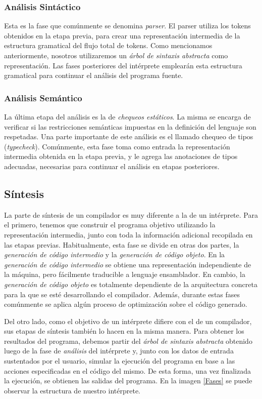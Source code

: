 \subsubsection{Análisis Sintáctico}

Esta es la fase que comúnmente se denomina \textit{parser}.
El parser utiliza los tokens obtenidos en la etapa previa, para crear una representación intermedia de la estructura gramatical del flujo total de tokens.
Como mencionamos anteriormente, nosotros utilizaremos un \textit{árbol de sintaxis abstracta} como representación.
Las fases posteriores del intérprete emplearán esta estructura gramatical para continuar el análisis del programa fuente.

\subsubsection{Análisis Semántico}

La última etapa del análisis es la de \textit{chequeos estáticos}.
La misma se encarga de verificar si las restricciones semánticas impuestas en la definición del lenguaje son respetadas.
Una parte importante de este análisis es el llamado chequeo de tipos (\textit{typecheck}).
Comúnmente, esta fase toma como entrada la representación intermedia obtenida en la etapa previa, y le agrega las anotaciones de tipos adecuadas, necesarias para continuar el análisis en etapas posteriores.

\subsection{Síntesis}

La parte de síntesis de un compilador es muy diferente a la de un intérprete.
Para el primero, tenemos que construir el programa objetivo utilizando la representación intermedia, junto con toda la información adicional recopilada en las etapas previas.
Habitualmente, esta fase se divide en otras dos partes, la \textit{generación de código intermedio} y la \textit{generación de código objeto}.
En la \textit{generación de código intermedio} se obtiene una representación independiente de la máquina, pero fácilmente traducible a lenguaje ensamblador.
En cambio, la \textit{generación de código objeto} es totalmente dependiente de la arquitectura concreta para la que se esté desarrollando el compilador.
Además, durante estas fases comúnmente se aplica algún proceso de optimización sobre el código generado.

Del otro lado, como el objetivo de un intérprete difiere con el de un compilador, sus etapas de síntesis también lo hacen en la misma manera.
Para obtener los resultados del programa, debemos partir del \textit{árbol de sintaxis abstracta} obtenido luego de la fase de \textit{análisis} del intérprete y, junto con los datos de entrada sustentados por el usuario, simular la ejecución del programa en base a las acciones especificadas en el código del mismo.
De esta forma, una vez finalizada la ejecución, se obtienen las salidas del programa.
En la imagen \ref{Fases} se puede observar la estructura de nuestro intérprete.

